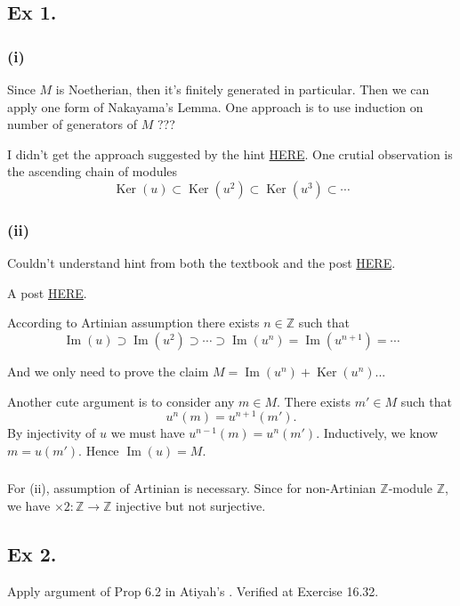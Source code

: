 \subsection{Ex 1.}\label{Atiyah Chapter 6 Ex 1.}

\subsubsection{(i)}

Since $M$ is Noetherian, then it's finitely generated in particular. 
Then we can apply one form of Nakayama's Lemma.
One approach is to use induction on number of generators of $M$ ??? 

I didn't get the approach suggested by the hint \href{https://math.stackexchange.com/questions/145310/proving-that-surjective-endomorphisms-of-noetherian-modules-are-isomorphisms-and}{HERE}.
One crutial observation is the ascending chain of modules
$$\operatorname{Ker}(u)\subset\operatorname{Ker}(u^2)\subset\operatorname{Ker}(u^3)\subset\cdots$$

\subsubsection{(ii)}

Couldn't understand hint from both the textbook and the post \href{https://math.stackexchange.com/questions/145310/proving-that-surjective-endomorphisms-of-noetherian-modules-are-isomorphisms-and}{HERE}. 

A post \href{https://math.stackexchange.com/questions/273181/if-m-is-an-artinian-module-and-f-m-to-m-is-an-injective-homomorphism-then}{HERE}.

According to Artinian assumption there exists $n\in \mathbb Z$ such that 
$$\operatorname{Im}(u)\supset\operatorname{Im}(u^2)\supset\cdots\supset \operatorname{Im}(u^n)=\operatorname{Im}(u^{n+1})=\cdots$$

And we only need to prove the claim $M=\operatorname{Im}(u^n)+\operatorname{Ker}(u^n)$... 

Another cute argument is to consider any $m\in M$. There exists $m'\in M$ such that 
$$u^n(m)=u^{n+1}(m').$$
By injectivity of $u$ we must have $u^{n-1}(m)=u^n(m')$. Inductively, we know $m=u(m')$. Hence $\operatorname{Im}(u)=M$.

\subsubsection{}
For (ii), assumption of Artinian is necessary. Since for non-Artinian $\mathbb Z$-module $\mathbb Z$, we have $\times 2:\mathbb Z\to \mathbb Z$ injective but not surjective.

\subsection{Ex 2.}

Apply argument of Prop 6.2 in Atiyah's \cite{atiyah1994introduction}.
Verified at \cite{altman} Exercise 16.32. 